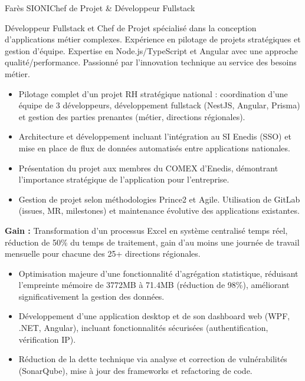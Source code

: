 \documentclass[a4paper,11pt]{article}
\begin{document}
\begin{cv}[profile][2]
{Farès SIONI}{Chef de Projet \& Développeur Fullstack}

    Développeur Fullstack et Chef de Projet spécialisé dans la conception d'applications métier complexes.
    Expérience en pilotage de projets stratégiques et gestion d'équipe.
    Expertise en Node.js/TypeScript et Angular avec une approche qualité/performance.
    Passionné par l'innovation technique au service des besoins métier.

    \begin{cvevent}[08/2023][08/2025]
        \begin{itemize}
            \item Pilotage complet d'un projet RH stratégique national : coordination d'une équipe de 3 développeurs, développement fullstack (NestJS, Angular, Prisma) et gestion des parties prenantes (métier, directions régionales).
            \item Architecture et développement incluant l'intégration au SI Enedis (SSO) et mise en place de flux de données automatisés entre applications nationales.
            \item Présentation du projet aux membres du COMEX d'Enedis, démontrant l'importance stratégique de l'application pour l'entreprise.
            \item Gestion de projet selon méthodologies Prince2 et Agile. Utilisation de GitLab (issues, MR, milestones) et maintenance évolutive des applications existantes.
        \end{itemize}
        \textbf{Gain :} Transformation d'un processus Excel en système centralisé temps réel, réduction de 50\% du temps de traitement, gain d'au moins une journée de travail mensuelle pour chacune des 25+ directions régionales.
    \end{cvevent}

\cvseparator[2]
    \begin{cvevent}[06/2023][08/2023]
        \begin{itemize}
            \item Optimisation majeure d'une fonctionnalité d'agrégation statistique, réduisant l'empreinte mémoire de 3772MB à 71.4MB (réduction de 98\%), améliorant significativement la gestion des données.
            \item Développement d'une application desktop et de son dashboard web (WPF, .NET, Angular), incluant fonctionnalités sécurisées (authentification, vérification IP).
            \item Réduction de la dette technique via analyse et correction de vulnérabilités (SonarQube), mise à jour des frameworks et refactoring de code.
        \end{itemize}
    \end{cvevent}


\end{cv}
\end{document}
